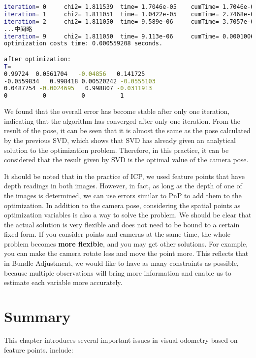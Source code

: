 \begin{lstlisting}[language=sh, caption=终端输出：]
iteration= 0	 chi2= 1.811539	 time= 1.7046e-05	 cumTime= 1.7046e-05	 edges= 74	 schur= 0
iteration= 1	 chi2= 1.811051	 time= 1.0422e-05	 cumTime= 2.7468e-05	 edges= 74	 schur= 0
iteration= 2	 chi2= 1.811050	 time= 9.589e-06	 cumTime= 3.7057e-05	 edges= 74	 schur= 0
...中间略
iteration= 9	 chi2= 1.811050	 time= 9.113e-06	 cumTime= 0.000100604	 edges= 74	 schur= 0
optimization costs time: 0.000559208 seconds.

after optimization:
T=
0.99724  0.0561704   -0.04856   0.141725
-0.0559834   0.998418 0.00520242 -0.0555103
0.0487754 -0.0024695   0.998807 -0.0311913
0          0          0          1
\end{lstlisting}

We found that the overall error has become stable after only one iteration, indicating that the algorithm has converged after only one iteration. From the result of the pose, it can be seen that it is almost the same as the pose calculated by the previous SVD, which shows that SVD has already given an analytical solution to the optimization problem. Therefore, in this practice, it can be considered that the result given by SVD is the optimal value of the camera pose.

It should be noted that in the practice of ICP, we used feature points that have depth readings in both images. However, in fact, as long as the depth of one of the images is determined, we can use errors similar to PnP to add them to the optimization. In addition to the camera pose, considering the spatial points as optimization variables is also a way to solve the problem. We should be clear that the actual solution is very flexible and does not need to be bound to a certain fixed form. If you consider points and cameras at the same time, the whole problem becomes \textbf{more flexible}, and you may get other solutions. For example, you can make the camera rotate less and move the point more. This reflects that in Bundle Adjustment, we would like to have as many constraints as possible, because multiple observations will bring more information and enable us to estimate each variable more accurately.

\section{Summary}
This chapter introduces several important issues in visual odometry based on feature points. include:

